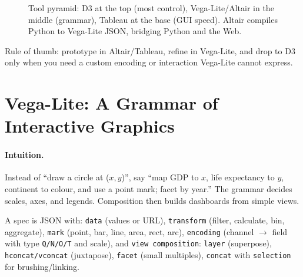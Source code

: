 \begin{figure}[h]
\caption{Tool pyramid: D3 at the top (most control), Vega-Lite/Altair in the middle (grammar), Tableau at the base (GUI speed). Altair compiles Python to Vega-Lite JSON, bridging Python and the Web.}
\label{fig:tool-pyramid}
\end{figure}

Rule of thumb: prototype in Altair/Tableau, refine in Vega-Lite, and drop to D3 only when you need a custom encoding or interaction Vega-Lite cannot express.

\section{Vega-Lite: A Grammar of Interactive Graphics}
\label{sec:vegalite}
\paragraph{Intuition.} Instead of ``draw a circle at ($x,y$)'', say ``map GDP to $x$, life expectancy to $y$, continent to colour, and use a point mark; facet by year.'' The grammar decides scales, axes, and legends. Composition then builds dashboards from simple views.

\begin{definition}\label{def:vegalite}
A spec is JSON with: \texttt{data} (values or URL), \texttt{transform} (filter, calculate, bin, aggregate), \texttt{mark} (point, bar, line, area, rect, arc), \texttt{encoding} (channel $\to$ field with type \texttt{Q/N/O/T} and scale), and \texttt{view composition}: \texttt{layer} (superpose), \texttt{hconcat/vconcat} (juxtapose), \texttt{facet} (small multiples), \texttt{concat} with \texttt{selection} for brushing/linking.
\end{definition}

